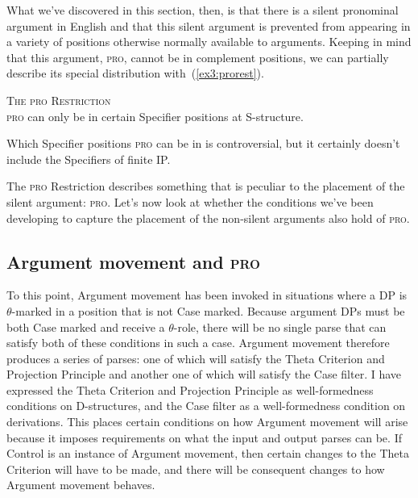 What we've discovered in this section, then, is that there is a silent pronominal argument in English and that this silent argument is prevented from appearing in a variety of positions otherwise normally available to arguments. Keeping in mind that this argument, \textsc{pro}, cannot be in complement positions, we can partially describe its special distribution with~(\ref{ex3:prorest}).
\begin{exe}
\ex \label{ex3:prorest} \textsc{The \textsc{pro} Restriction}\\
\textsc{pro} can only be in certain Specifier positions at S-structure.
\end{exe}
Which Specifier positions \textsc{pro} can be in is controversial, but it certainly doesn't include the Specifiers of finite IP.

The \textsc{pro} Restriction describes something that is peculiar to the placement of the silent argument: \textsc{pro}. Let's now look at whether the conditions we've been developing to capture the placement of the non-silent arguments also hold of \textsc{pro}.

\subsection{Argument movement and \textsc{pro}}

To this point, Argument movement has been invoked in situations where a DP is \mbox{$\theta$-marked} in a position that is not Case marked. Because argument DPs must be both Case marked and receive a \mbox{$\theta$-role}, there will be no single parse that can satisfy both of these conditions in such a case. Argument movement therefore produces a series of parses: one of which will satisfy the Theta Criterion and Projection Principle and another one of which will satisfy the Case filter. I have expressed the Theta Criterion and Projection Principle as well-formedness conditions on D-structures, and the Case filter as a well-formedness condition on derivations. This places certain conditions on how Argument movement will arise because it imposes requirements on what the input and output parses can be. If Control is an instance of Argument movement, then certain changes to the Theta Criterion will have to be made, and there will be consequent changes to how Argument movement behaves.

